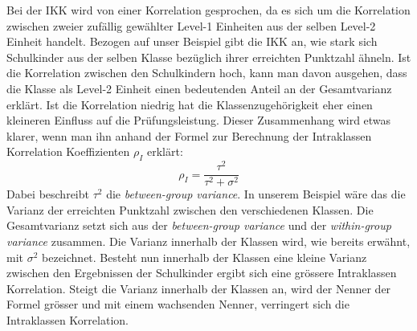 \documentclass[12pt]{article}\usepackage[]{graphicx}\usepackage[]{color}
\numberwithin{equation}{section}
\begin{document}
Bei der IKK wird von einer Korrelation gesprochen, da es sich um die Korrelation zwischen zweier zufällig gewählter Level-1 Einheiten aus der selben Level-2 Einheit handelt. Bezogen auf unser Beispiel gibt die IKK an, wie stark sich Schulkinder aus der selben Klasse bezüglich ihrer erreichten Punktzahl ähneln. Ist die Korrelation zwischen den Schulkindern hoch, kann man davon ausgehen, dass die Klasse als Level-2 Einheit einen bedeutenden Anteil an der Gesamtvarianz erklärt. Ist die Korrelation niedrig hat die Klassenzugehörigkeit eher einen kleineren Einfluss auf die Prüfungsleistung. Dieser Zusammenhang wird etwas klarer, wenn man ihn anhand der Formel zur Berechnung der Intraklassen Korrelation Koeffizienten $\rho_{I}$ erklärt:
\begin{equation} \label{eq:icc}
\rho_{I} = \dfrac{\tau^{2}}{\tau^{2} + \sigma^{2}}
\end{equation} 
Dabei beschreibt $\tau^2$ die \textit{between-group variance}. In unserem Beispiel wäre das die Varianz der erreichten Punktzahl zwischen den verschiedenen Klassen. Die Gesamtvarianz setzt sich aus der \textit{between-group variance} und der \textit{within-group variance} zusammen. Die Varianz innerhalb der Klassen wird, wie bereits erwähnt, mit $\sigma^2$ bezeichnet. Besteht nun innerhalb der Klassen eine kleine Varianz zwischen den Ergebnissen der Schulkinder ergibt sich eine grössere Intraklassen Korrelation. Steigt die Varianz innerhalb der Klassen an, wird der Nenner der Formel grösser und mit einem wachsenden Nenner, verringert sich die Intraklassen Korrelation.
\end{document}
